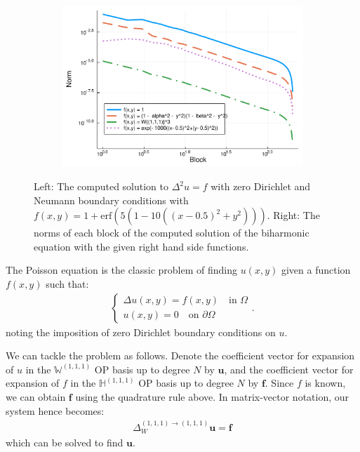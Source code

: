 \documentclass[11pt, oneside]{article}   	%
\newcommand{\hdop}{H}
\newcommand{\bighdopiii}{{\mathbb{\hdop}^{(1,1,1)}}}
\newcommand{\laplacewiii}{\Delta_W^{(1,1,1)\to(1,1,1)}}
\newcommand{\bigWiii}{{\mathbb{W}^{(1,1,1)}}}
\begin{document}
\begin{figure}[t]
\begin{subfigure}{0.3\textwidth}
	\end{subfigure}
	\begin{subfigure}{0.5\textwidth}
	\includegraphics[scale=0.5]{solutionblocknorms-biharmonic-diskslice-alpha=0p2-beta=0p8-N=200}
	\centering
	\end{subfigure}
	\caption{Left: The computed solution to $\Delta^2 u = f$ with zero Dirichlet and Neumann boundary conditions with $f(x,y) = 1 + \text{erf}(5(1 - 10((x - 0.5)^2 + y^2)))$. Right: The norms of each block of the computed solution of the biharmonic equation with the given right hand side functions.}
	\centering
	\label{fig:biharmonic}
\end{figure}

The Poisson equation is the classic problem of finding \(u(x,y)\) given a function \(f(x,y)\) such that:
\begin{align}
	\begin{cases}
    		\Delta u(x,y) = f(x,y) \quad \text{in } \Omega \\
		u(x,y) = 0 \quad \text{on } \partial \Omega
	\end{cases}.
	\label{eqn:poisson}
\end{align}
noting the imposition of zero Dirichlet boundary conditions on $u$.

We can tackle the problem as follows. Denote the coefficient vector for expansion of $u$ in the $\bigWiii$ OP basis up to degree $N$ by $\mathbf{u}$, and the coefficient vector for expansion of $f$ in the $\bighdopiii$ OP basis up to degree $N$ by $\mathbf{f}$. Since $f$ is known, we can obtain $\mathbf{f}$ using the quadrature rule above. In matrix-vector notation, our system hence becomes:
\begin{align*}
    \laplacewiii \mathbf{u} = \mathbf{f}
\end{align*}
which can be solved to find $\mathbf{u}$.
\end{document}
